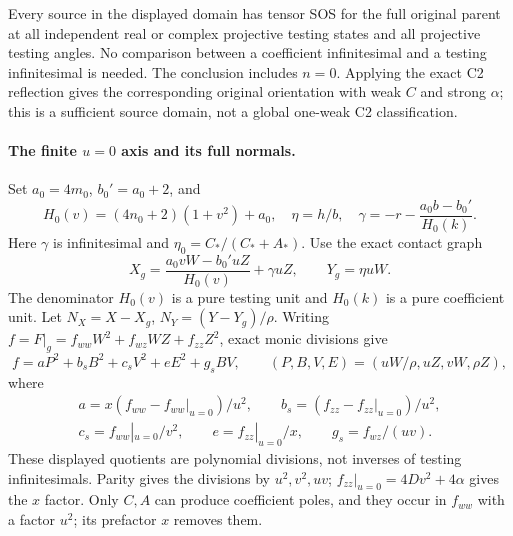 \begin{theorem}
\label{pec59340d644f:thm:c2-general-single-angle}
Every source in the displayed domain has tensor SOS for the full
original parent at all independent real or complex projective testing
states and all projective testing angles.  No comparison between a
coefficient infinitesimal and a testing infinitesimal is needed.
The conclusion includes $n=0$.  Applying the exact C2 reflection gives
the corresponding original orientation with weak $C$ and strong
$\alpha$; this is a sufficient source domain, not a global one-weak
C2 classification.
\end{theorem}

\paragraph{The finite $u=0$ axis and its full normals.}
Set $a_0=4m_0$, $b_0'=a_0+2$, and
\[
 H_0(v)=(4n_0+2)(1+v^2)+a_0,\quad \eta=h/b,
 \quad \gamma=-r-\frac{a_0b-b_0'}{H_0(k)}.
\]
Here $\gamma$ is infinitesimal and $\eta_0=C_* /(C_*+A_*)$.
Use the exact contact graph
\[
 X_g=\frac{a_0vW-b_0'uZ}{H_0(v)}+\gamma uZ,
 \qquad Y_g=\eta uW.
\]
The denominator $H_0(v)$ is a pure testing unit and $H_0(k)$ is a
pure coefficient unit.  Let $N_X=X-X_g$, $N_Y=(Y-Y_g)/\rho$.
Writing $f=F|_g=f_{ww}W^2+f_{wz}WZ+f_{zz}Z^2$, exact monic divisions give
\[
 f=aP^2+b_s B^2+c_s V^2+eE^2+g_sBV,
 \qquad(P,B,V,E)=(uW/\rho,uZ,vW,\rho Z),
\]
where
\[
 \begin{gathered}
 a=x(f_{ww}-f_{ww}|_{u=0})/u^2,\qquad
 b_s=(f_{zz}-f_{zz}|_{u=0})/u^2,\\
 c_s=f_{ww}|_{u=0}/v^2,\qquad e=f_{zz}|_{u=0}/x,\qquad
 g_s=f_{wz}/(uv).
 \end{gathered}
\]
These displayed quotients are polynomial divisions, not inverses of
testing infinitesimals.  Parity gives the divisions by $u^2,v^2,uv$;
$f_{zz}|_{u=0}=4Dv^2+4\alpha$ gives the $x$ factor.  Only $C,A$ can
produce coefficient poles, and they occur in $f_{ww}$ with a factor
$u^2$; its prefactor $x$ removes them.

